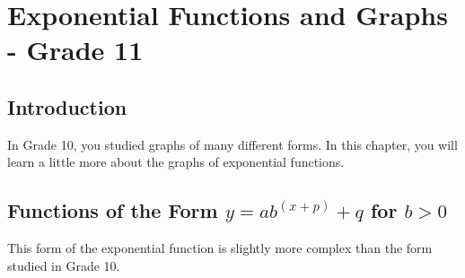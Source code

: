 \chapter{Exponential Functions and Graphs - Grade 11}
\label{m:fg:e11}

\section{Introduction}
In Grade 10, you studied graphs of many different forms. In this chapter, you will learn a little more about the graphs of exponential functions.


\section{Functions of the Form $y=ab^{(x+p)} + q$ for $b> 0$}
This form of the exponential function is slightly more complex than the form studied in Grade 10.

